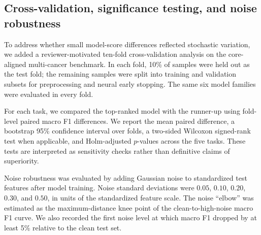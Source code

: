 \subsection{Cross-validation, significance testing, and noise robustness}

To address whether small model-score differences reflected stochastic variation, we added a reviewer-motivated ten-fold cross-validation analysis on the core-aligned multi-cancer benchmark. In each fold, 10\% of samples were held out as the test fold; the remaining samples were split into training and validation subsets for preprocessing and neural early stopping. The same six model families were evaluated in every fold.

For each task, we compared the top-ranked model with the runner-up using fold-level paired macro F1 differences. We report the mean paired difference, a bootstrap 95\% confidence interval over folds, a two-sided Wilcoxon signed-rank test when applicable, and Holm-adjusted \(p\)-values across the five tasks. These tests are interpreted as sensitivity checks rather than definitive claims of superiority.

Noise robustness was evaluated by adding Gaussian noise to standardized test features after model training. Noise standard deviations were \(0.05\), \(0.10\), \(0.20\), \(0.30\), and \(0.50\), in units of the standardized feature scale. The noise ``elbow'' was estimated as the maximum-distance knee point of the clean-to-high-noise macro F1 curve. We also recorded the first noise level at which macro F1 dropped by at least 5\% relative to the clean test set.
